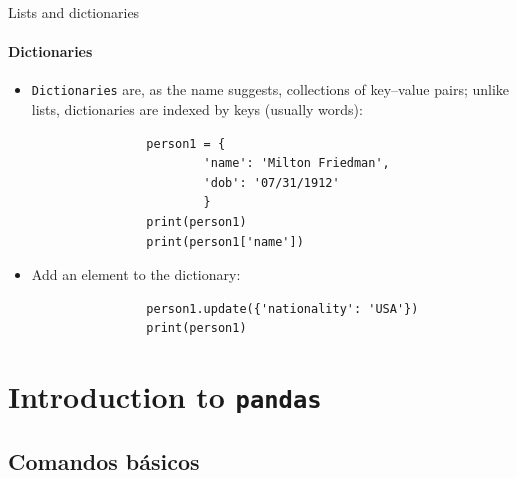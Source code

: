 \documentclass[notes,11pt, aspectratio=169, xcolor=table]{beamer}
\begin{document}
    \begin{frame}[fragile=singleslide]{Lists and dictionaries}
    \framesubtitle{Dictionaries}
        
         \begin{itemize}
            \item \texttt{Dictionaries} are, as the name suggests, collections of key–value pairs; unlike lists, dictionaries are indexed by keys (usually words):

                \begin{verbatim}
                person1 = {
                        'name': 'Milton Friedman',
                        'dob': '07/31/1912'
                        }
                print(person1)
                print(person1['name'])
                \end{verbatim}    

            \item Add an element to the dictionary:

                \begin{verbatim}
                person1.update({'nationality': 'USA'})
                print(person1)
                \end{verbatim}    

        \end{itemize}             

    
   

    \end{frame}

    \section{Introduction to \texttt{pandas}}

        \subsection{Comandos básicos}
\end{document}
